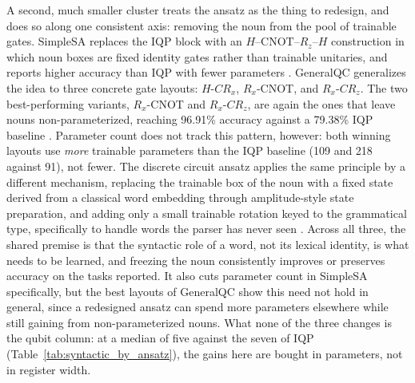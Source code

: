 \documentclass{ieeeaccess}
\begin{document}
A second, much smaller cluster treats the ansatz as the thing to redesign, and does so along one consistent axis: removing the noun from the pool of trainable gates. SimpleSA replaces the IQP block with an $H$--CNOT--$R_z$--$H$ construction in which noun boxes are fixed identity gates rather than trainable unitaries, and reports higher accuracy than IQP with fewer parameters \cite{ruskanda_simple_2023}. GeneralQC generalizes the idea to three concrete gate layouts: $H$-$CR_x$, $R_x$-CNOT, and $R_x$-$CR_z$. The two best-performing variants, $R_x$-CNOT and $R_x$-$CR_z$, are again the ones that leave nouns non-parameterized, reaching 96.91\% accuracy against a 79.38\% IQP baseline \cite{abiwardani_generalized_2025}. Parameter count does not track this pattern, however: both winning layouts use \emph{more} trainable parameters than the IQP baseline (109 and 218 against 91), not fewer. The discrete circuit ansatz applies the same principle by a different mechanism, replacing the trainable box of the noun with a fixed state derived from a classical word embedding through amplitude-style state preparation, and adding only a small trainable rotation keyed to the grammatical type, specifically to handle words the parser has never seen \cite{bhatuse_resolving_2025}. Across all three, the shared premise is that the syntactic role of a word, not its lexical identity, is what needs to be learned, and freezing the noun consistently improves or preserves accuracy on the tasks reported. It also cuts parameter count in SimpleSA specifically, but the best layouts of GeneralQC show this need not hold in general, since a redesigned ansatz can spend more parameters elsewhere while still gaining from non-parameterized nouns. What none of the three changes is the qubit column: at a median of five against the seven of IQP (Table~\ref{tab:syntactic_by_ansatz}), the gains here are bought in parameters, not in register width.
\end{document}
